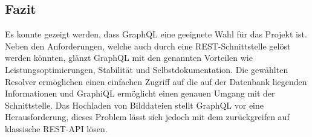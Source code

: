 \subsection*{Fazit}
Es konnte gezeigt werden, dass GraphQL eine geeignete Wahl für das Projekt ist.
Neben den Anforderungen, welche auch durch eine REST-Schnittstelle gelöst werden könnten, glänzt GraphQL mit den genannten Vorteilen wie Leistungsoptimierungen, Stabilität und Selbstdokumentation.
Die gewählten Resolver ermöglichen einen einfachen Zugriff auf die auf der Datenbank liegenden Informationen und GraphiQL ermöglicht einen genauen Umgang mit der Schnittstelle.
Das Hochladen von Bilddateien stellt GraphQL vor eine Herausforderung, dieses Problem lässt sich jedoch mit dem zurückgreifen auf klassische REST-API lösen.